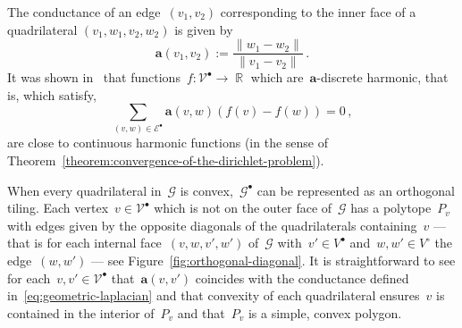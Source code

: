\documentclass[12pt]{amsart}
\numberwithin{equation}{section}
\DeclareMathOperator{\R}{\mathbb{R}}
\DeclareMathOperator{\C}{\mathbb{C}}
\newcommand{\G}{\mathcal{G}}
\newcommand{\V}{\mathcal{V}}
\newcommand{\E}{\mathcal{E}}
\newcommand{\cond}{\hyperref[eq:geometric-laplacian]{\mathbf{a}}}
\begin{document}
The conductance of an edge~$(v_1, v_2)$ corresponding to the inner face of a quadrilateral $(v_1, w_1, v_2, w_2)$ is given by 
\[
\mathbf{a}(v_1, v_2) := \frac{ \|w_1 - w_2\|}{\|v_1 -v_2\|} \, . 
\]
It was shown in~\cite{gurel2020dirichlet} that functions~$f: \V^{\bullet} \to \R$ which are~$\mathbf{a}$-discrete harmonic, that is, which satisfy,
\[
\sum_{(v, w) \in \E^{\bullet}} \mathbf{a}(v, w) (f(v) - f(w)) = 0  \, , 
\]
are close to continuous harmonic functions (in the sense of Theorem~\ref{theorem:convergence-of-the-dirichlet-problem}). 

When every quadrilateral in~$\G$ is convex,~$\G^{\bullet}$ can be represented as an orthogonal tiling. Each vertex~$v \in \V^{\bullet}$
which is not on the outer face of~$\G$ has a polytope~$P_v$ with edges given by the opposite diagonals of the quadrilaterals
containing~$v$ --- that is for each internal face~$(v, w, v', w')$ of~$\G$ with~$v' \in V^{\bullet}$ and~$w,w' \in V^{\circ}$  the edge~$(w, w')$ --- see Figure~\ref{fig:orthogonal-diagonal}. It is straightforward to see for each~$v, v' \in \V^{\bullet}$ that~$\mathbf{a}(v, v')$ coincides
with the conductance defined in~\eqref{eq:geometric-laplacian} and that convexity of each quadrilateral ensures~$v$ is contained in the interior of~$P_v$ and that~$P_v$ is a simple, convex polygon.


\end{document}
